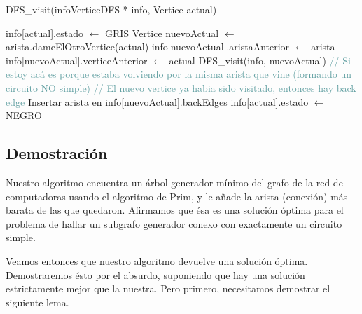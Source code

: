 \begin{algorithm}[H]
\begin{algorithmic}[1]
\caption{DFS\_visit(infoVerticeDFS * info, Vertice actual)}
\STATE info[actual].estado $\leftarrow$ GRIS
    \STATE Vertice nuevoActual $\leftarrow$ arista.dameElOtroVertice(actual)
        \STATE info[nuevoActual].aristaAnterior $\leftarrow$ arista
        \STATE info[nuevoActual].verticeAnterior $\leftarrow$ actual
        \STATE DFS\_visit(info, nuevoActual)
            \STATE \textcolor{CadetBlue}{// Si estoy acá es porque estaba volviendo por la misma arista que vine (formando un circuito NO simple)}
        \ELSE
            \STATE \textcolor{CadetBlue}{// El nuevo vertice ya habia sido visitado, entonces hay back edge}
            \STATE Insertar arista en info[nuevoActual].backEdges
        \ENDIF
    \ENDIF
\ENDFOR
\STATE info[actual].estado $\leftarrow$ NEGRO
\end{algorithmic}
\end{algorithm}

\subsection{Demostración}

Nuestro algoritmo encuentra un árbol generador mínimo del grafo de la red de computadoras usando el algoritmo de Prim, y le añade la arista (conexión) más barata de las que quedaron. Afirmamos que ésa es una solución óptima para el problema de hallar un subgrafo generador conexo con exactamente un circuito simple.

Veamos entonces que nuestro algoritmo devuelve una solución óptima. Demostraremos ésto por el absurdo, suponiendo que hay una solución estrictamente mejor que la nuestra. Pero primero, necesitamos demostrar el siguiente lema.

